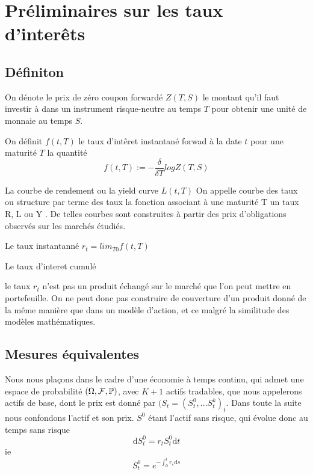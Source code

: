 

\chapter{Préliminaires sur les taux d'interêts}

\section{Définiton}
\begin{defn}
On dénote le prix de zéro coupon forwardé $Z(T, S)$ le montant qu'il faut investir à dans un instrument risque-neutre au temps $T$ pour obtenir une unité de monnaie au temps $S$.
\end{defn}

\begin{defn}
On définit $f(t, T)$ le taux d'intêret instantané forwad à la date $t$ pour une maturité $T$ la quantité $$f(t, T) := - \frac{ \delta}{\delta T}  log Z(T, S)$$
\end{defn}
\begin{defn}
  La courbe de rendement ou la yield curve $L(t, T)$
  On appelle courbe des taux ou structure par terme des taux la fonction associant à une maturité T un taux R, L ou Y . De telles courbes sont construites à partir des prix d’obligations observés sur les marchés étudiés.
\end{defn}

\begin{defn} Le taux instantanné
$r_t = lim_{T 0}f(t, T) $ 
\end{defn}

\begin{defn}
Le taux d'interet cumulé
\end{defn}
le taux $r_t$ n’est pas un produit échangé sur le marché que l’on peut mettre en portefeuille. On ne peut donc pas construire de couverture d’un produit donné de la même manière que dans un modèle d’action, et ce malgré la similitude des modèles mathématiques.

\section{Mesures équivalentes}

Nous nous plaçons dans le cadre d'une économie à temps continu, qui admet une espace de probabilité $(\Omega, \cal{F}, \mathbb{P})$, avec $K+1$ actifs tradables, que nous appelerons actifs de base, dont le prix est donné par $(S_t = (S^0_t, ...S^k_t)_t$. Dans toute la suite nous confondons l'actif et son prix.
$S^0$ étant l'actif sans risque, qui évolue donc au temps sans risque $$\mathrm{d}S^0_t = r_t S^0_t \mathrm{d}t$$
ie $$S^0_t = e^{-\int_0^t r_s \mathrm{d}s}$$

